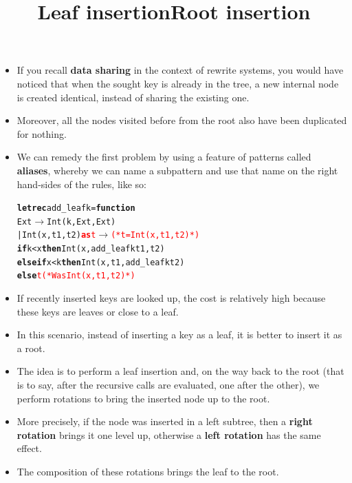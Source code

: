 \documentclass[wide]{slides}
\begin{document}
\begin{slide}
  \title{Leaf insertion}

  \begin{itemize}

    \item If you recall \textbf{data sharing} in the context of
      rewrite systems, you would have noticed that when the sought key
      is already in the tree, a new internal node is created
      identical, instead of sharing the existing one.

    \item Moreover, all the nodes visited before from the root also
      have been duplicated for nothing.

    \item We can remedy the first problem by using a feature of \OCaml
      patterns called \textbf{aliases}, whereby we can name a
      subpattern and use that name on the right hand\hyp{}sides of the
      rules, like so:
      \smallskip
\begin{alltt}
\textbf{let rec} add_leaf k = \textbf{function}
  Ext \(\rightarrow\) Int (k, Ext, Ext)
| Int (x,t1,t2) \textcolor{red}{\textbf{as} t} \(\rightarrow\) \textcolor{red}{(* t = Int (x,t1,t2) *)}
    \textbf{if} k < x \textbf{then} Int (x, add_leaf k t1, t2)
    \textbf{else if} x < k \textbf{then} Int (x, t1, add_leaf k t2)
                     \textbf{else} \textcolor{red}{t (* Was Int (x,t1,t2) *)}
\end{alltt}

  \end{itemize}

\end{slide}

\begin{slide}
  \title{Root insertion}

  \begin{itemize}

    \item If recently inserted keys are looked up, the cost is
      relatively high because these keys are leaves or close to a
      leaf.

    \item In this scenario, instead of inserting a key as a leaf, it
      is better to insert it as a root.

    \item The idea is to perform a leaf insertion and, on the way back
      to the root (that is to say, after the recursive calls are
      evaluated, one after the other), we perform rotations to bring
      the inserted node up to the root.

    \item More precisely, if the node was inserted in a left subtree,
      then a \textbf{right rotation} brings it one level up, otherwise
      a \textbf{left rotation} has the same effect.

    \item The composition of these rotations brings the leaf to the
      root.

  \end{itemize}

\end{slide}
\end{document}

